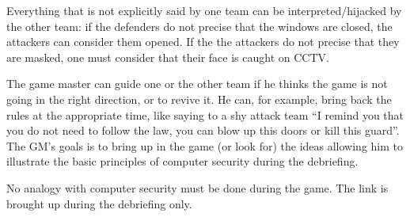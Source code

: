 \documentclass[11pt]{article} %
\begin{document}
Everything that is not explicitly said by one team can be 
interpreted/hijacked by the other team: if the defenders do not 
precise that the windows are closed, the attackers can consider them opened.
If the the attackers do not precise that they are masked, one must 
consider that their face is caught on CCTV.

%

The game master can guide one or the other team if he thinks the game
is not going in the right direction, or to revive it. He can, for example, 
bring back the rules at the appropriate time, like saying to a 
shy attack team ``I remind you that you do not need to follow the law, you
can blow up this doors or kill this guard''. The GM's goals is to bring up in the game 
(or look for) the ideas allowing him to illustrate the basic principles of computer 
security during the debriefing.

No analogy with computer security must be done during the game. 
The link is brought up during the debriefing only.

\end{document}

